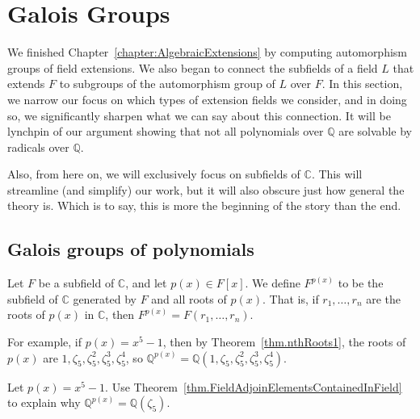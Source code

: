 \chapter{Galois Groups}
\label{chapter:GaloisGroups}
\thispagestyle{empty}

We finished Chapter~\ref{chapter:AlgebraicExtensions} by computing automorphism groups of field extensions. We also began to connect the subfields of a field $L$ that extends $F$ to subgroups of the automorphism group of $L$ over $F$. In this section, we narrow our focus on which types of extension fields we consider, and in doing so, we significantly sharpen what we can say about this connection. It will be lynchpin of our argument showing that not all polynomials over $\mathbb{Q}$ are solvable by radicals over $\mathbb{Q}$.

Also, from here on, we will exclusively focus on subfields of $\mathbb{C}$. This will streamline (and simplify) our work, but it will also obscure just how general the theory is. Which is to say, this is more the beginning of the story than the end. 

\section{Galois groups of polynomials}

\begin{definition}\label{def.SplittingField}
Let $F$ be a subfield of $\mathbb{C}$, and let $p(x) \in F[x]$. We define $F^{p(x)}$ to be the subfield of $\mathbb{C}$ generated by $F$ and all roots of $p(x)$.
That is, if $r_1,\ldots,r_n$ are the roots of $p(x)$ in $\mathbb{C}$, then $F^{p(x)}=F(r_1,\ldots,r_n)$. 
\end{definition}

For example, if  $p(x) = x^5 - 1$, then by Theorem~\ref{thm.nthRoots1}, the roots of $p(x)$ are $1,\zeta_5,\zeta_5^2,\zeta_5^3,\zeta_5^4$, so $\mathbb{Q}^{p(x)}=\mathbb{Q}(1,\zeta_5,\zeta_5^2,\zeta_5^3,\zeta_5^4)$.

\begin{problem}
Let $p(x) = x^5 - 1$. Use Theorem~\ref{thm.FieldAdjoinElementsContainedInField} to explain why $\mathbb{Q}^{p(x)}=\mathbb{Q}(\zeta_5)$.
\end{problem}

